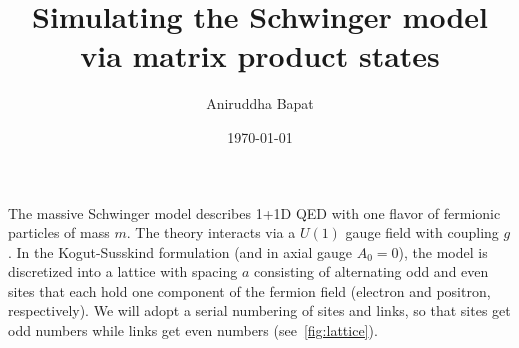 \documentclass[aps,prl,reprint,superscriptaddress, onecolumn, 11pt]{revtex4-2}
\theoremstyle{definition}
\theoremstyle{definition}
\begin{document}

\title{Simulating the Schwinger model via matrix product states}


\author{Aniruddha Bapat}


\date{\today}

\begin{abstract}
\end{abstract}

\maketitle
The massive Schwinger model describes 1+1D QED with one flavor of fermionic particles of mass $m$. The theory interacts via a $U(1)$ gauge field with coupling $g$. In the Kogut-Susskind formulation (and in axial gauge $A_0=0$), the model is discretized into a lattice with spacing $a$ consisting of alternating odd and even sites that each hold one component of the fermion field (electron and positron, respectively). We will adopt a serial numbering of sites and links, so that sites get odd numbers while links get even numbers (see~\cref{fig:lattice}).
\end{document}

